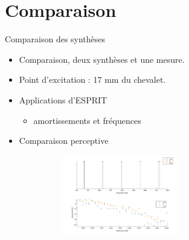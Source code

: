\section{Comparaison}

\begin{frame}{Comparaison des synthèses}
 \begin{itemize}
  \item Comparaison, deux synthèses et une mesure.
  \item Point d'excitation : 17 mm du chevalet.
  \item Applications d'ESPRIT
  \begin{itemize}
    \item amortissements et fréquences
  \end{itemize}
  \item Comparaison perceptive
 \end{itemize}
 
      \begin{figure}
		\centering
		\includegraphics[width=8cm,height=3.5cm]{figures/apotheose.png}
	\end{figure}
\end{frame}
